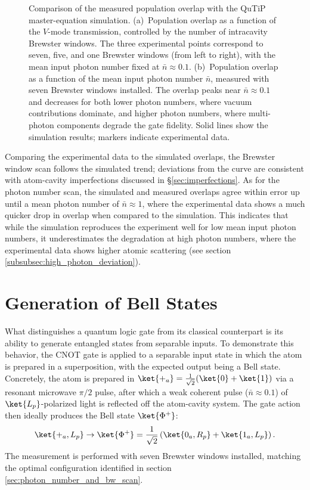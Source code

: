 \begin{figure}[htpb]
	\centering
	
	\caption{Comparison of the measured population overlap with the QuTiP master-equation simulation.
		(a)~Population overlap as a function of the $V$-mode transmission, controlled by the number of intracavity Brewster windows.
		The three experimental points correspond to seven, five, and one Brewster windows (from left to right), with the mean input photon number fixed at $\bar{n} \approx 0.1$.
		(b)~Population overlap as a function of the mean input photon number $\bar{n}$, measured with seven Brewster windows installed.
		The overlap peaks near $\bar{n} \approx 0.1$ and decreases for both lower photon numbers, where vacuum contributions dominate, and higher photon numbers, where multi-photon components degrade the gate fidelity.
		Solid lines show the simulation results; markers indicate experimental data.}
	\label{fig:comparison_sim_experiment}
\end{figure}

Comparing the experimental data to the simulated overlaps, the Brewster window scan follows the simulated trend; deviations from the curve are consistent with atom-cavity imperfections discussed in §\ref{sec:imperfections}. As for the photon number scan, the simulated and measured overlaps agree within error up until a mean photon number of $\bar{n}\approx 1$, where the experimental data shows a much quicker drop in overlap when compared to the simulation. This indicates that while the simulation reproduces the experiment well for low mean input photon numbers, it underestimates the degradation at high photon numbers, where the experimental data shows higher atomic scattering (see section \ref{subsubsec:high_photon_deviation}).

\section{Generation of Bell States} \label{sec:bs_states}

What distinguishes a quantum logic gate from its classical counterpart is its ability to generate entangled states from separable inputs. To demonstrate this behavior, the CNOT gate is applied to a separable input state in which the atom is prepared in a superposition, with the expected output being a Bell state. Concretely, the atom is prepared in $\ket{+_a}=\frac{1}{\sqrt{2}}(\ket{0}+\ket{1})$ via a resonant microwave $\pi/2$ pulse, after which a weak coherent pulse ($\bar{n}\approx0.1$) of $\ket{L_p}$-polarized light is reflected off the atom-cavity system. The gate action then ideally produces the Bell state $\ket{\Phi^+}$:
\begin{equation}
	\ket{+_a, L_p} \rightarrow \ket{\Phi^+} = \frac{1}{\sqrt{2}}\left(\ket{0_a, R_p} + \ket{1_a, L_p}\right).
\end{equation}
The measurement is performed with seven Brewster windows installed, matching the optimal configuration identified in section \ref{sec:photon_number_and_bw_scan}.


